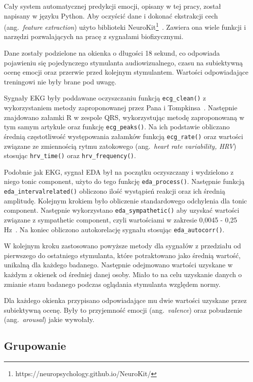 Cały system automatycznej predykcji emocji, opisany w tej pracy, został napisany w języku Python.
Aby oczyścić dane i dokonać ekstrakcji cech (ang.~\textit{feature extraction}) użyto biblioteki NeuroKit\footnote{https://neuropsychology.github.io/NeuroKit/}~\cite{Neurokit}.
Zawiera ona wiele funkcji i narzędzi pozwalających na pracę z sygnałami biofizycznymi.

Dane zostały podzielone na okienka o długości 18 sekund, co odpowiada pojawieniu się pojedynczego stymulanta audiowizualnego, czasu na subiektywną ocenę emocji oraz przerwie przed kolejnym stymulantem.
Wartości odpowiadające treningowi nie były brane pod uwagę.

Sygnały EKG były poddawane oczyszczaniu funkcją \texttt{ecg\_clean()} z wykorzystaniem metody zaproponowanej przez Pana i Tompkinsa~\cite{Pan1985}.
Następnie znajdowano załamki R w zespole QRS, wykorzystując metodę zaproponowaną w tym samym artykule oraz funkcję \texttt{ecg\_peaks()}.
Na ich podstawie obliczano średnią częstotliwość występowania załamków funkcją \texttt{ecg\_rate()} oraz wartości związane ze zmiennością rytmu zatokowego (ang.~\textit{heart rate variability, HRV}) stosując \texttt{hrv\_time()} oraz \texttt{hrv\_frequency()}.

Podobnie jak EKG, sygnał EDA był na początku oczyszczany i wydzielono z niego tonic component, użyto do tego funkcję \texttt{eda\_process()}.
Następnie funkcją \texttt{eda\_intervalrelated()} obliczono ilość wystąpień reakcji oraz ich średnią amplitudę.
Kolejnym krokiem było obliczenie standardowego odchylenia dla tonic component.
Następnie wykorzystano \texttt{eda\_sympathetic()} aby uzyskać wartości związane z sympathetic component, czyli wartościami w zakresie 0,0045 - 0,25 Hz~\cite{Posada2016}.
Na koniec obliczono autokorelację sygnału stosując \texttt{eda\_autocorr()}.

W kolejnym kroku zastosowano powyższe metody dla sygnałów z przedziału od pierwszego do ostatniego stymulanta, które potraktowano jako średnią wartość, unikalną dla każdego badanego.
Następnie odejmowano wartości uzyskane w każdym z okienek od średniej danej osoby.
Miało to na celu uzyskanie danych o zmianie stanu badanego podczas oglądania stymulanta względem normy.

Dla każdego okienka przypisano odpowiadające mu dwie wartości uzyskane przez subiektywną ocenę.
Były to przyjemność emocji (ang.~\textit{valence}) oraz pobudzenie (ang.~\textit{arousal}) jakie wywołały.

\subsection{Grupowanie}\label{subsec:grupowanie}

